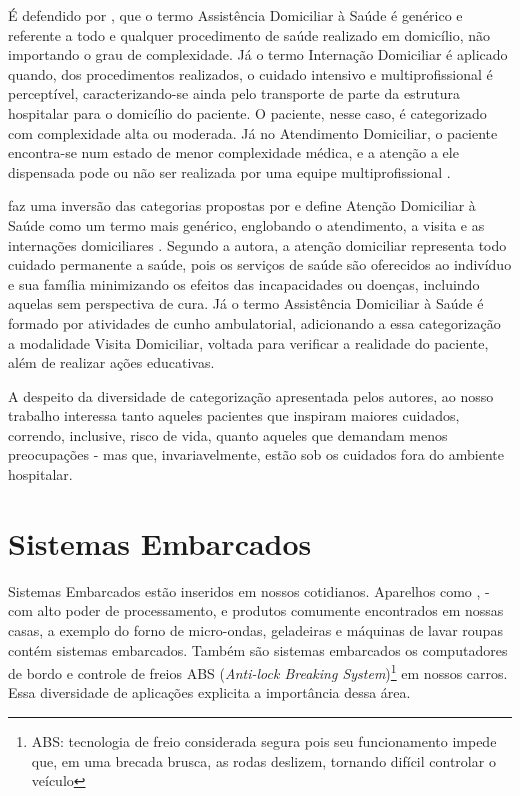 
É defendido por , que o termo Assistência Domiciliar
à Saúde é genérico e referente a todo e qualquer procedimento de saúde realizado
em domicílio, não importando o grau de complexidade. Já o termo Internação
Domiciliar é aplicado quando, dos procedimentos realizados, o cuidado intensivo
e multiprofissional é perceptível, caracterizando-se ainda pelo transporte de
parte da estrutura hospitalar para o domicílio do paciente. O paciente, nesse
caso, é categorizado com complexidade alta ou moderada.
Já no Atendimento Domiciliar, o paciente encontra-se num estado de menor 
complexidade médica, e a atenção a ele dispensada pode ou não ser realizada por
uma equipe multiprofissional \cite{tavolari2000desenvolvimento}.

 faz uma inversão das categorias propostas
por  e  define Atenção Domiciliar à
Saúde como um termo mais genérico, englobando o atendimento, a visita e as
internações domiciliares \cite{giacomozzi2006pratica}. Segundo a autora, a
atenção domiciliar representa todo cuidado permanente a
saúde, pois os serviços de saúde são oferecidos ao indivíduo e sua família
minimizando os efeitos das incapacidades ou doenças, incluindo aquelas
sem perspectiva de cura. Já o termo Assistência Domiciliar à Saúde é formado
por atividades de cunho ambulatorial, adicionando a essa categorização a
modalidade Visita Domiciliar, voltada para verificar a realidade do paciente,
além de realizar ações educativas.

A despeito da diversidade de categorização apresentada pelos autores, ao nosso
trabalho interessa tanto aqueles pacientes que inspiram maiores cuidados,
correndo, inclusive, risco de vida, quanto aqueles que demandam menos
preocupações - mas que, invariavelmente, estão sob os cuidados fora do
ambiente hospitalar.

\section{Sistemas Embarcados}\label{sec:sistemas-embarcados}

Sistemas Embarcados estão inseridos em nossos cotidianos. Aparelhos como
\smartphones[], \tablets[] - com alto poder de processamento, e
produtos comumente encontrados em nossas casas, a exemplo do forno de 
micro-ondas, geladeiras e máquinas de lavar roupas contém sistemas embarcados. 
Também são sistemas embarcados os computadores de bordo e
controle de freios ABS (\textit{Anti-lock Breaking System})\footnote{ABS:
tecnologia  de freio considerada segura pois seu funcionamento impede que, em
uma brecada brusca, as rodas  deslizem, tornando difícil controlar o veículo} em
nossos carros. Essa diversidade de aplicações explicita a importância dessa área.

